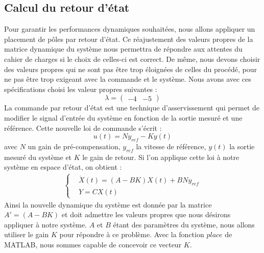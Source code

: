 \subsection{Calcul du retour d'état}
\label{sub:Calcul du retour etat}
Pour garantir les performances dynamiques souhaitées, nous allons appliquer un placement de pôles par retour d'état. Ce réajustement des valeurs propres de la matrice dynamique du système nous permettra de répondre aux attentes du cahier de charges si le choix de celles-ci est correct. De même, nous devons choisir des valeurs propres qui ne sont pas être trop éloignées de celles du procédé, pour ne pas être trop exigeant avec la commande et le système. Nous avons avec ces spécifications choisi les valeur propres suivantes :
\begin{equation}
\label{equation:valeurPropres}
\lambda = \begin{pmatrix}
-4 &-5
\end{pmatrix}
\end{equation}
La commande par retour d'état est une technique d'asservissement qui permet de modifier le signal d'entrée du système en fonction de la sortie mesuré et une référence. Cette nouvelle loi de commande s'écrit : 
\begin{equation}
u(t) = Ny_{ref}-Ky(t)
\end{equation} avec $N$ un gain de pré-compensation, $y_{ref}$ la vitesse de référence, $y(t)$ la sortie mesuré du système et $K$ le gain de retour. Si l'on applique cette loi à notre système en espace d'état, on obtient : 
\begin{align*}
\left\lbrace
\begin{aligned}
&\dot{X}(t) = (A-BK)X(t) + BNy_{ref}\\
&Y = CX(t)
\end{aligned}
\right.
\end{align*}
Ainsi la nouvelle dynamique du système est donnée par la matrice $A' = (A-BK)$ et doit admettre les valeurs propres que nous désirons appliquer à notre système. $A$ et $B$ étant des paramètres du système, nous allons utiliser le gain $K$ pour répondre à ce problème. Avec la fonction $place$ de MATLAB, nous sommes capable de concevoir ce vecteur $K$. 

